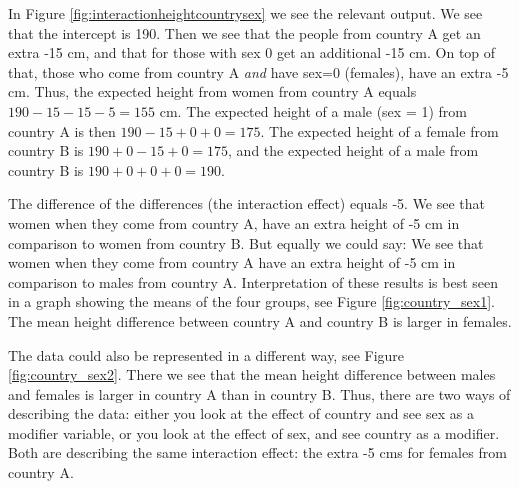 \documentclass[]{report}\usepackage[]{graphicx}\usepackage[]{color}
\makeatletter
\newenvironment{kframe}{%
 \def\at@end@of@kframe{}%
 \ifinner\ifhmode%
  \def\at@end@of@kframe{\end{minipage}}%
  \begin{minipage}{\columnwidth}%
 \fi\fi%
 \def\FrameCommand##1{\hskip\@totalleftmargin \hskip-\fboxsep
 \colorbox{shadecolor}{##1}\hskip-\fboxsep
     \hskip-\linewidth \hskip-\@totalleftmargin \hskip\columnwidth}%
 \MakeFramed {\advance\hsize-\width
   \@totalleftmargin\z@ \linewidth\hsize
   \@setminipage}}%
 {\par\unskip\endMakeFramed%
 \at@end@of@kframe}
\newenvironment{knitrout}{}{} %
\makeatother
\begin{document}
In Figure \ref{fig:interactionheightcountrysex} we see the relevant output. We see that the intercept is 190. Then we see that the people from country A get an extra -15 cm, and that for those with sex 0 get an additional -15 cm. On top of that, those who come from country A \textit{and} have sex=0 (females), have an extra -5 cm. Thus, the expected height from women from country A equals $190-15-15-5=155$ cm. The expected height of a male (sex = 1) from country A is then $190 - 15 + 0  + 0 = 175$. The expected height of a female from country B is $190 + 0 -15 +0 =175$, and the expected height of a male from country B is $190 + 0 + 0 + 0 = 190$. 

The difference of the differences (the interaction effect) equals -5. We see that women when they come from country A, have an extra height of -5 cm in comparison to women from country B. But equally we could say: We see that women when they come from country A have an extra height of -5 cm in comparison to males from country A. Interpretation of these results is best seen in a graph showing the means of the four groups, see Figure \ref{fig:country_sex1}. The mean height difference between country A and country B is larger in females.

\begin{knitrout}
\color{fgcolor}\begin{kframe}


{\ttfamily\noindent\bfseries{}}

{\ttfamily\noindent\bfseries{}}

{\ttfamily\noindent\bfseries\color{errorcolor}{\#\# Error in filter\_impl(.data, quo): Evaluation error: object 'country' not found.}}\end{kframe}
\end{knitrout}


The data could also be represented in a different way, see Figure \ref{fig:country_sex2}. There we see that the mean height difference between males and females is larger in country A than in country B. Thus, there are two ways of describing the data: either you look at the effect of country and see sex as a modifier variable, or you look at the effect of sex, and see country as a modifier. Both are describing the same interaction effect: the extra -5 cms for females from country A.
\end{document}
